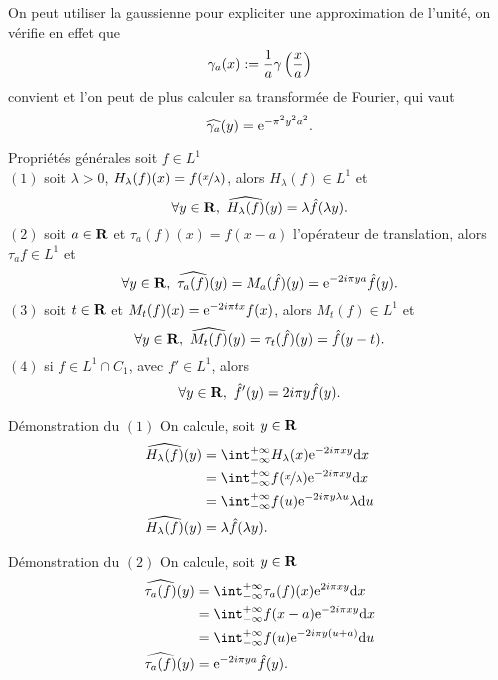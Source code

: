 \documentclass[a4paper,11pt, twoside]{article}
\begin{document}
\begin{RQ}
  On peut utiliser la gaussienne pour expliciter une approximation de l'unité, on vérifie en effet que 
  $$\gamma_a(x):=\frac{1}{a}\gamma\left(\frac{x}{a}\right)$$
  convient et l'on peut de plus calculer sa transformée de Fourier, qui vaut 
  $$\widehat{\gamma_a}(y)=\mathrm{e}^{-\pi^2 y^2a^2}.$$
\end{RQ}


\begin{propC}{Propriétés générales } soit $f\in L^1$\\

  $(\mathit 1)$ soit $\lambda>0$, $H_\lambda(f)(x)=f(\nicefrac{x}{\lambda})$, alors $H_\lambda(f)\in L^1$ et 
  $$\forall y\in\R,\ \widehat{H_\lambda(f)}(y)=\lambda \hat f(\lambda y).$$
  $(\mathit 2)$ soit $a\in\mathbf R$ et $\tau_a(f)(x)=f(x-a)$ l'opérateur de translation, alors $\tau_af\in L^1$ et 
  $$\forall y\in\R,\ \widehat{\tau_a(f)}(y)=M_{a}(\hat f)(y)=\ex{-2i\pi ya}\hat f(y).$$
  $(\mathit 3)$ soit $t\in\mathbf R$ et $M_t(f)(x)=\mathrm{e}^{-2i\pi tx}f(x)$, alors $M_t(f)\in L^1$ et 
  $$\forall y\in\R,\ \widehat{M_t(f)}(y)=\tau_{t}(\hat f)(y)=\hat f(y-t).$$
  $(\mathit 4)$ si $f\in L^1\cap C_1$, avec $f'\in L^1$, alors 
  $$\forall y\in\mathbf R,\ \hat f'(y)=2i\pi y\hat f(y).$$
\end{propC}


\begin{ProofC}{Démonstration du $(\mathit 1)$}
  On calcule, soit $y\in\mathbf R$
  \begin{align*}
    \widehat{H_\lambda(f)}(y)&=\intr H_{\lambda}(x)\ex{-2i\pi xy}\dx\\
    &=\intr f(\nicefrac{x}{\lambda})\ex{-2i\pi xy}\dx\\
    &=\intr f(u)\ex{-2i\pi y\lambda u}\lambda\du\\
    \widehat{H_\lambda(f)}(y)&=\lambda \hat f(\lambda y).
  \end{align*}
\end{ProofC}


\begin{ProofC}{Démonstration du $(\mathit 2)$}
  On calcule, soit $y\in\mathbf R$
  \begin{align*}
    \widehat{\tau_a(f)}(y)&=\intr \tau_a(f)(x)\ex{2i\pi xy}\dx\\
    &=\intr f(x-a)\ex{-2i\pi xy}\dx\\
    &=\intr f(u)\ex{-2i\pi y(u+a)}\du\\
    \widehat{\tau_a(f)}(y)&=\ex{-2i\pi ya}\hat f(y).
  \end{align*}
\end{ProofC}
\end{document}
